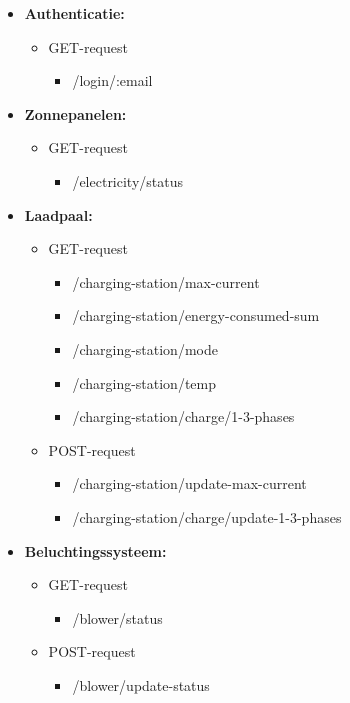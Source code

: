 \begin{itemize}
    \item \textbf{Authenticatie:}
          \begin{itemize}
              \item GET-request
                    \begin{itemize}
                        \item /login/:email
                    \end{itemize}
          \end{itemize}
    \item \textbf{Zonnepanelen:}
          \begin{itemize}
              \item GET-request
                    \begin{itemize}
                        \item /electricity/status
                    \end{itemize}
          \end{itemize}
    \item \textbf{Laadpaal:}
          \begin{itemize}
              \item GET-request
                    \begin{itemize}
                        \item /charging-station/max-current
                        \item /charging-station/energy-consumed-sum
                        \item /charging-station/mode
                        \item /charging-station/temp
                        \item /charging-station/charge/1-3-phases
                    \end{itemize}
              \item POST-request
                    \begin{itemize}
                        \item /charging-station/update-max-current
                        \item /charging-station/charge/update-1-3-phases
                    \end{itemize}
          \end{itemize}
    \item \textbf{Beluchtingssysteem:}
          \begin{itemize}
              \item GET-request
                    \begin{itemize}
                        \item /blower/status
                    \end{itemize}
              \item POST-request
                    \begin{itemize}
                        \item /blower/update-status
                    \end{itemize}
          \end{itemize}
\end{itemize}

